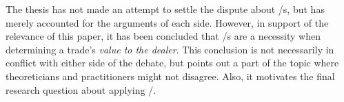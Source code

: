 \documentclass[main.tex]{subfiles}
\begin{document}
    The thesis has not made an attempt to settle the dispute about \FVA/s,
    but has merely accounted for the arguments of each side.
    However, in support of the relevance of this paper,
    it has been concluded that \FVA/s are a necessity 
    when determining a trade's \textit{value to the dealer}.
    This conclusion is not necessarily in conflict with either side of the debate,
    but points out a part of the topic where theoreticians and practitioners might not disagree.
    Also, it motivates the final research question about applying \FVA/.

    \textbf{\researchQuestionFvaImplications}
\end{document}
